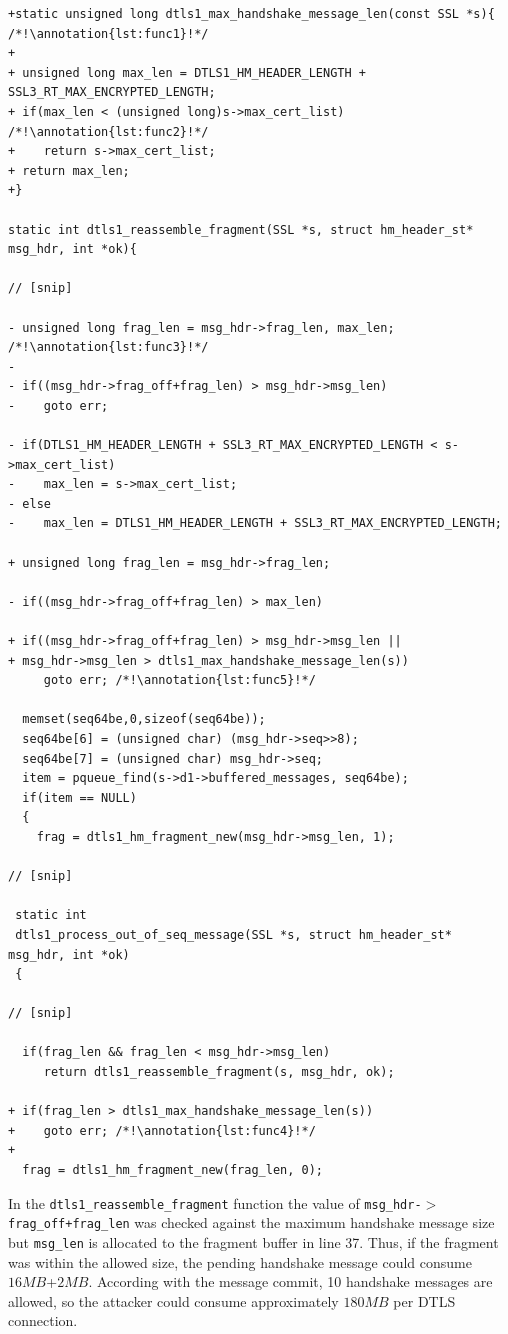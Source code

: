 \documentclass[10pt,conference]{IEEEtran}
\newcounter{lstannotation}
\renewcommand{\thelstannotation}{\ding{\number\numexpr181+\arabic{lstannotation}}}
\newcommand{\annotation}[1]{\refstepcounter{lstannotation}\label{#1}\thelstannotation}
\newcommand{\Sof}[1]{\textbf{[Sofia:[}{\color{red} #1}\textbf{]]}}
\begin{document}
\setcounter{lstannotation}{0}
\begin{lstlisting}[caption={Fix provided by OpenSSL developers to the CVE-2014-3506 vulnerability \Sof{@todo: Fix the regex issue}},label={lst:vuln}]
+static unsigned long dtls1_max_handshake_message_len(const SSL *s){ /*!\annotation{lst:func1}!*/
+
+ unsigned long max_len = DTLS1_HM_HEADER_LENGTH + SSL3_RT_MAX_ENCRYPTED_LENGTH;
+ if(max_len < (unsigned long)s->max_cert_list) /*!\annotation{lst:func2}!*/
+    return s->max_cert_list;
+ return max_len;
+} 

static int dtls1_reassemble_fragment(SSL *s, struct hm_header_st* msg_hdr, int *ok){
    
// [snip]

- unsigned long frag_len = msg_hdr->frag_len, max_len; /*!\annotation{lst:func3}!*/
-
- if((msg_hdr->frag_off+frag_len) > msg_hdr->msg_len) 
-    goto err; 

- if(DTLS1_HM_HEADER_LENGTH + SSL3_RT_MAX_ENCRYPTED_LENGTH < s->max_cert_list)
-    max_len = s->max_cert_list;
- else
-    max_len = DTLS1_HM_HEADER_LENGTH + SSL3_RT_MAX_ENCRYPTED_LENGTH;

+ unsigned long frag_len = msg_hdr->frag_len;
 
- if((msg_hdr->frag_off+frag_len) > max_len)

+ if((msg_hdr->frag_off+frag_len) > msg_hdr->msg_len ||
+ msg_hdr->msg_len > dtls1_max_handshake_message_len(s))
     goto err; /*!\annotation{lst:func5}!*/
	 
  memset(seq64be,0,sizeof(seq64be));
  seq64be[6] = (unsigned char) (msg_hdr->seq>>8);
  seq64be[7] = (unsigned char) msg_hdr->seq;
  item = pqueue_find(s->d1->buffered_messages, seq64be);
  if(item == NULL)
  {
    frag = dtls1_hm_fragment_new(msg_hdr->msg_len, 1);
		
// [snip]
 
 static int
 dtls1_process_out_of_seq_message(SSL *s, struct hm_header_st* msg_hdr, int *ok)
 {
 
// [snip]

  if(frag_len && frag_len < msg_hdr->msg_len)
     return dtls1_reassemble_fragment(s, msg_hdr, ok);
 
+ if(frag_len > dtls1_max_handshake_message_len(s))
+    goto err; /*!\annotation{lst:func4}!*/
+
  frag = dtls1_hm_fragment_new(frag_len, 0);

\end{lstlisting}

In the \texttt{dtls1\_reassemble\_fragment} function the value of \texttt{msg\_hdr-$>$frag\_off+frag\_len} was checked against the
maximum handshake message size but \texttt{msg\_len} is allocated to the fragment buffer in line 37. Thus, if the fragment was within
the allowed size, the pending handshake message could consume $16MB$+$2MB$. According with the message commit, 10 handshake messages
are allowed, so the attacker could consume approximately $180MB$ per DTLS connection.
\end{document}
